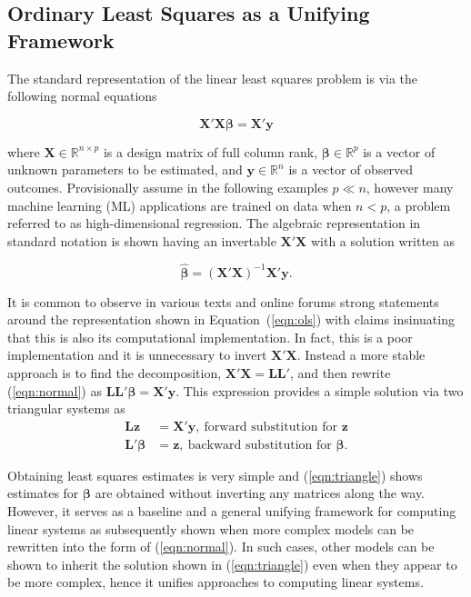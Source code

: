 \documentclass[12pt]{article}
\begin{document}
\subsection*{Ordinary Least Squares as a Unifying Framework}

The standard representation of the linear least squares problem is via the following normal equations \cite{mcandsearle:2001}   

\begin{equation}
\label{eqn:normal}
\bm{X'X\beta} = \bm{X'y}
\end{equation}

\noindent where $\bm{X}\in\mathbb{R}^{n \times p}$ is a design matrix of full column rank, $\bm{\beta} \in \mathbb{R}^p$ is a vector of unknown parameters to be estimated, and $\bm{y} \in \mathbb{R}^n$ is a vector of observed outcomes. Provisionally assume in the following examples $p \ll n$, however many machine learning (ML) applications are trained on data when $n < p$, a problem referred to as high-dimensional regression. The algebraic representation in standard notation is shown having an invertable $\bm{X'X}$ with a solution written as

\begin{equation}
\label{eqn:ols}
\widehat{\bm{\beta}} = \bm{(X'X)}^{-1} \bm{X'y}.
\end{equation}

It is common to observe in various texts and online forums strong statements around the representation shown in Equation~(\ref{eqn:ols}) with claims insinuating that this is also its computational implementation. In fact, this is a poor implementation and it is unnecessary to invert $\bm{X'X}$. Instead a more stable approach is to find the decomposition, $\bm{X'X} = \bm{LL'}$, and then rewrite (\ref{eqn:normal}) as $\bm{LL'\beta} = \bm{X'y}$. This expression provides a simple solution via two triangular systems as
\begin{align}
\label{eqn:triangle}
\bm{Lz}  & =  \bm{X'y}, \ \text{forward substitution for $\bm{z}$}\\
\bm{L'\beta}  &=  \bm{z}, \ \text{backward substitution for $\bm{\beta}$} \nonumber.  
\end{align}

Obtaining least squares estimates is very simple and (\ref{eqn:triangle}) shows estimates for $\bm{\beta}$ are obtained without inverting any matrices along the way. However, it serves as a baseline and a general unifying framework for computing linear systems as subsequently shown when more complex models can be rewritten into the form of (\ref{eqn:normal}). In such cases, other models can be shown to inherit the solution shown in (\ref{eqn:triangle}) even when they appear to be more complex, hence it unifies approaches to computing linear systems.
\end{document}
